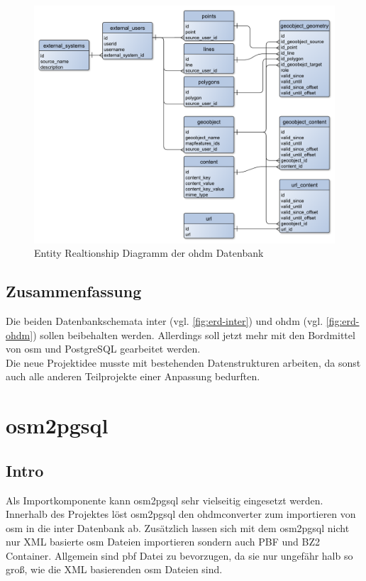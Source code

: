 \begin{figure}[h]
	\caption{Entity Realtionship Diagramm der \gls{ohdm} Datenbank}
	\label{fig:erd-ohdm}
	\includegraphics[width=\linewidth]{img/ohdm-db-erd.pdf}
\end{figure}

\section{Zusammenfassung}
Die beiden Datenbankschemata \gls{inter} (vgl. \autoref{fig:erd-inter}) und \gls{ohdm} (vgl. \autoref{fig:erd-ohdm}) sollen beibehalten werden. Allerdings soll jetzt mehr mit den Bordmittel von \gls{osm} und PostgreSQL gearbeitet werden.\\

Die neue Projektidee musste mit bestehenden Datenstrukturen arbeiten, da sonst auch alle anderen Teilprojekte einer Anpassung bedurften.

\chapter{osm2pgsql}
\section{Intro}
Als Importkomponente kann osm2pgsql\cite{osm2pgsql-manual} sehr vielseitig eingesetzt werden. Innerhalb des Projektes löst osm2pgsql den \gls{ohdmconverter} zum importieren von \gls{osm} in die \gls{inter} Datenbank ab. Zusätzlich lassen sich mit dem osm2pgsql nicht nur XML basierte \gls{osm} Dateien importieren sondern auch PBF und BZ2 Container. Allgemein sind \gls{pbf} Datei zu bevorzugen, da sie nur ungefähr halb so groß, wie die XML basierenden \gls{osm} Dateien sind.\cite{osm:pbf}\\

